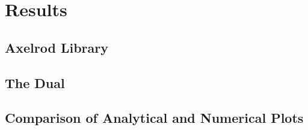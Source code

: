
\chapter{Results}\label{cha:results}

\section{Axelrod Library}

\section{The Dual}

\section{Comparison of Analytical and Numerical Plots}


